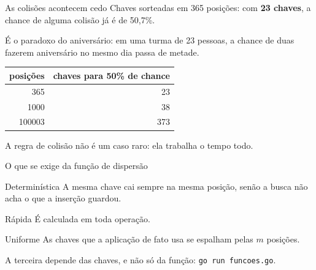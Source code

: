 \documentclass{beamer}
\begin{document}
\begin{frame}{As colisões acontecem cedo}
	Chaves sorteadas em 365 posições: com \textbf{23 chaves}, a chance de alguma
	colisão já é de 50,7\%.

	\vspace{0.3cm}
	É o paradoxo do aniversário: em uma turma de 23 pessoas, a chance de duas
	fazerem aniversário no mesmo dia passa de metade.

	\vspace{0.4cm}
	\begin{center}
		\small
		\begin{tabular}{rr}
			\toprule
			\textbf{posições} & \textbf{chaves para 50\% de chance} \\
			\midrule
			365               & 23                                  \\
			1000              & 38                                  \\
			100003            & 373                                 \\
			\bottomrule
		\end{tabular}
	\end{center}

	\vspace{0.3cm}
	A regra de colisão não é um caso raro: ela trabalha o tempo todo.
\end{frame}

\begin{frame}{O que se exige da função de dispersão}
	\begin{block}{Determinística}
		A mesma chave cai sempre na mesma posição, senão a busca não acha o que a
		inserção guardou.
	\end{block}

	\begin{block}{Rápida}
		É calculada em toda operação.
	\end{block}

	\begin{block}{Uniforme}
		As chaves que a aplicação de fato usa se espalham pelas $m$ posições.
	\end{block}

	\vspace{0.2cm}
	A terceira depende das chaves, e não só da função: \texttt{go run funcoes.go}.
\end{frame}
\end{document}
